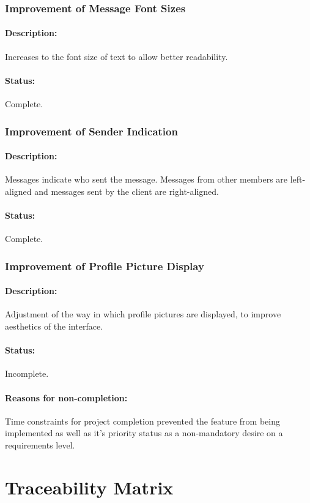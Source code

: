 \documentclass[11pt]{article}
\begin{document}
\subsubsection{Improvement of Message Font Sizes}
\paragraph{Description:} Increases to the font size of text to allow better readability.
\paragraph{Status:} Complete. 

\subsubsection{Improvement of Sender Indication}
\paragraph{Description:} Messages indicate who sent the message. Messages from other members are left-aligned and messages sent by the client are right-aligned.
\paragraph{Status:} Complete.

\subsubsection{Improvement of Profile Picture Display}
\paragraph{Description:} Adjustment of the way in which profile pictures are displayed, to improve aesthetics of the interface.
\paragraph{Status:} Incomplete.
\paragraph{Reasons for non-completion:} Time constraints for project completion prevented the feature from being implemented as well as it's priority status as a non-mandatory desire on a requirements level.

\section{Traceability Matrix}
\end{document}
